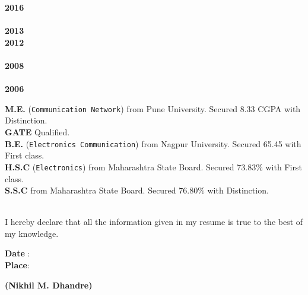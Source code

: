 \documentclass[a4paper,10pt]{memoir} %
\begin{document}
\Sep %
\begin{minipage}[t]{0.05\columnwidth}
\textbf{2016}\\
\\
\textbf{2013}\\
\textbf{2012}\\
\\
\textbf{2008}\\ 
\\
\textbf{2006}
\end{minipage}
\hfill
\begin{minipage}[t]{0.90\columnwidth}
\textbf{M.E.} (\texttt{Communication Network}) from Pune University. Secured 8.33 CGPA with Distinction.\\
\textbf{GATE} Qualified.\\
\textbf{B.E.} (\texttt{Electronics Communication}) from Nagpur University. Secured 65.45 with First class.\\
\textbf{H.S.C} (\texttt{Electronics}) from Maharashtra State Board. Secured 73.83\% with First class.\\
\textbf{S.S.C} from Maharashtra State Board. Secured 76.80\% with Distinction.
\end{minipage} \\



\vspace{1cm}
I hereby declare that all the information given in my resume is true to the best of my knowledge.
\vspace{1cm}
\begin{flushleft}
\textbf{\small Date} \hspace{0.20cm}:\, \\
\textbf{\small Place}\hspace{0.21cm}:\,    
\end{flushleft}

\begin{flushright}
\textbf{(\small Nikhil M. Dhandre)} 
\end{flushright}
\end{document}
